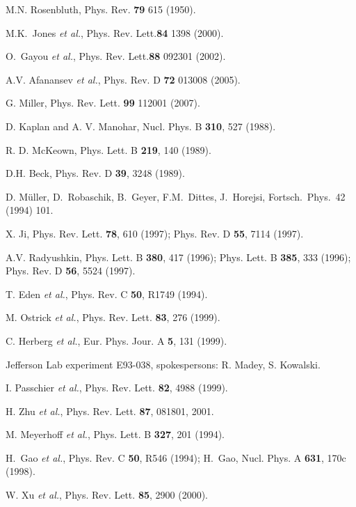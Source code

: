 \documentclass[12pt,letterpaper,oneside]{article}
\begin{document}
\newpage\noindent
\begin{thebibliography}{}
\newcommand {\etal} {{\it et al.}}
\newcommand {\PRL}  {Phys. Rev. Lett.}

 M.N. Rosenbluth, Phys. Rev. {\bf 79}  615 (1950).

 M.K.~Jones \etal, \PRL {\bf 84} 1398 (2000).

 O.~Gayou \etal, \PRL  {\bf 88}  092301 (2002).

 A.V. Afanansev \etal, Phys. Rev. D {\bf 72} 013008 (2005).


G. Miller, Phys. Rev. Lett. {\bf 99}  112001 (2007).

D. Kaplan and A. V. Manohar, Nucl. Phys. B {\bf 310}, 527 (1988).

R. D. McKeown, Phys. Lett. B {\bf 219}, 140 (1989).

D.H. Beck, Phys. Rev. D {\bf 39}, 3248 (1989).

D. M\"uller, D.~Robaschik, B.~Geyer, F.M.~Dittes, J.~Horejsi,
Fortsch.\ Phys.\  42 (1994) 101.

X. Ji, Phys. Rev. Lett. {\bf 78}, 610 (1997); 
Phys. Rev. D {\bf 55}, 7114 (1997).

A.V. Radyushkin, Phys. Lett. B {\bf 380}, 417 (1996); Phys. Lett. B {\bf 385}, 333 (1996); 
Phys. Rev. D {\bf 56}, 5524 (1997).


T. Eden {\it et al.}, Phys. Rev. C {\bf 50}, R1749 (1994).

M. Ostrick {\it et al.}, Phys. Rev. Lett. {\bf 83}, 276 (1999).

C. Herberg {\it et al.}, Eur. Phys. Jour. A {\bf 5}, 131 (1999).

Jefferson Lab experiment E93-038, spokespersons: R. Madey, S. Kowalski.

I. Passchier {\it et al.}, Phys. Rev. Lett. {\bf 82},  4988 (1999).

H. Zhu {\it et al.}, Phys. Rev. Lett. {\bf 87}, 081801, 2001.

M. Meyerhoff {\it et al.}, Phys. Lett. B {\bf 327}, 201 (1994).

H.~Gao {\it et al.}, Phys. Rev. C {\bf 50}, R546 (1994);
H.~Gao, Nucl. Phys. A {\bf 631}, 170c (1998).

W. Xu {\it et al.}, Phys. Rev. Lett. {\bf 85}, 2900 (2000).


\end{thebibliography}
\end{document}
